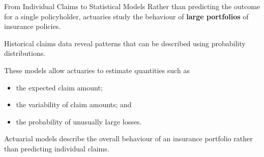 \documentclass[
  ignorenonframetext,
  aspectratio=169,
]{beamer}
\providecommand{\tightlist}{%
  \setlength{\itemsep}{0pt}\setlength{\parskip}{0pt}}
\begin{document}
\begin{frame}{From Individual Claims to Statistical Models}
\protect{}\label{from-individual-claims-to-statistical-models}
Rather than predicting the outcome for a single policyholder, actuaries
study the behaviour of \textbf{large portfolios} of insurance policies.

Historical claims data reveal patterns that can be described using
probability distributions.

These models allow actuaries to estimate quantities such as

\begin{itemize}
\tightlist
\item
  the expected claim amount;
\item
  the variability of claim amounts; and
\item
  the probability of unusually large losses.
\end{itemize}

\begin{tcolorbox}[enhanced jigsaw, arc=.35mm, bottomrule=.15mm, bottomtitle=1mm, breakable, colback=white, colbacktitle=quarto-callout-note-color!10!white, colframe=quarto-callout-note-color-frame, coltitle=black, left=2mm, leftrule=.75mm, opacityback=0, opacitybacktitle=0.6, rightrule=.15mm, title=\textcolor{quarto-callout-note-color}{\faInfo}\hspace{0.5em}{Key Idea}, titlerule=0mm, toprule=.15mm, toptitle=1mm]

Actuarial models describe the overall behaviour of an insurance
portfolio rather than predicting individual claims.

\end{tcolorbox}
\end{frame}
\end{document}
